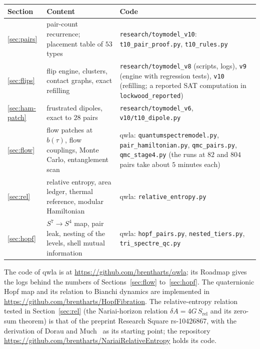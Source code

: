\documentclass[11pt]{article}
\theoremstyle{definition}
\begin{document}
\begin{center}\footnotesize
\begin{tabular}{@{}p{34mm}p{60mm}p{50mm}@{}}
\toprule
Section & Content & Code \\ \midrule
\ref{sec:pairs} & pair-count recurrence; placement table of $53$ types & \texttt{research/toymodel\_v10}: \texttt{t10\_pair\_proof.py}, \texttt{t10\_rules.py} \\
\ref{sec:flips} & flip engine, clusters, contact graphs, exact refilling & \texttt{research/toymodel\_v8} (scripts, logs), \texttt{v9} (engine with regression tests), \texttt{v10} (refilling; a reported SAT computation in \texttt{lockwood\_reported}) \\
\ref{sec:ham-patch} & frustrated dipoles, exact to $28$ pairs & \texttt{research/toymodel\_v6}, \texttt{v10/t10\_dipole.py} \\
\ref{sec:flow} & flow patches at $b(\tau)$, flow couplings, Monte Carlo, entanglement scan & qwla: \texttt{quantumspectremodel.py}, \texttt{pair\_hamiltonian.py}, \texttt{qmc\_pairs.py}, \texttt{qmc\_stage4.py} (the runs at $82$ and $804$ pairs take about $5$ minutes each) \\
\ref{sec:rel} & relative entropy, area ledger, thermal reference, modular Hamiltonian & qwla: \texttt{relative\_entropy.py} \\
\ref{sec:hopf} & $S^7\to S^4$ map, pair leak, nesting of the levels, shell mutual information & qwla: \texttt{hopf\_pairs.py}, \texttt{nested\_tiers.py}, \texttt{tri\_spectre\_qc.py} \\
\bottomrule
\end{tabular}
\end{center}
The code of qwla is at \url{https://github.com/brentharts/qwla}; its Roadmap gives the logs behind the numbers of Sections~\ref{sec:flow} to~\ref{sec:hopf}. The quaternionic Hopf map and its relation to Bianchi dynamics are implemented in \url{https://github.com/brentharts/HopfFibration}. The relative-entropy relation tested in Section~\ref{sec:rel} (the Nariai-horizon relation $\delta A=4G\,S_{\mathrm{rel}}$ and its zero-sum theorem) is that of the preprint Research Square rs-10426867, with the derivation of Dorau and Much~\cite{doraumuch} as its starting point; the repository \url{https://github.com/brentharts/NariaiRelativeEntropy} holds its code.



\end{document}
